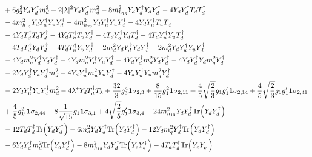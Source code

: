 {\begin{align}
 &+6 g_{2}^{2} {Y_d  Y_{d}^{\dagger}  m_d^2} -2 |\lambda|^2 {Y_d  Y_{d}^{\dagger}  m_d^2} -8 m_{h_{13}}^2 {Y_d  Y_{d}^{\dagger}  Y_d  Y_{d}^{\dagger}} -4 {Y_d  Y_{d}^{\dagger}  T_d  T_{d}^{\dagger}} \nonumber \\ 
 &-4 m_{h_{13}}^2 {Y_d  Y_{u}^{\dagger}  Y_u  Y_{d}^{\dagger}} -4 m_{h_{23}}^2 {Y_d  Y_{u}^{\dagger}  Y_u  Y_{d}^{\dagger}} -4 {Y_d  Y_{u}^{\dagger}  T_u  T_{d}^{\dagger}} \nonumber \\ 
 &-4 {Y_d  T_{d}^{\dagger}  T_d  Y_{d}^{\dagger}} -4 {Y_d  T_{u}^{\dagger}  T_u  Y_{d}^{\dagger}} -4 {T_d  Y_{d}^{\dagger}  Y_d  T_{d}^{\dagger}} -4 {T_d  Y_{u}^{\dagger}  Y_u  T_{d}^{\dagger}} \nonumber \\ 
 &-4 {T_d  T_{d}^{\dagger}  Y_d  Y_{d}^{\dagger}} -4 {T_d  T_{u}^{\dagger}  Y_u  Y_{d}^{\dagger}} -2 {m_d^2  Y_d  Y_{d}^{\dagger}  Y_d  Y_{d}^{\dagger}} -2 {m_d^2  Y_d  Y_{u}^{\dagger}  Y_u  Y_{d}^{\dagger}} \nonumber \\ 
 &-4 {Y_d  m_q^2  Y_{d}^{\dagger}  Y_d  Y_{d}^{\dagger}} -4 {Y_d  m_q^2  Y_{u}^{\dagger}  Y_u  Y_{d}^{\dagger}} -4 {Y_d  Y_{d}^{\dagger}  m_d^2  Y_d  Y_{d}^{\dagger}} -4 {Y_d  Y_{d}^{\dagger}  Y_d  m_q^2  Y_{d}^{\dagger}} \nonumber \\ 
 &-2 {Y_d  Y_{d}^{\dagger}  Y_d  Y_{d}^{\dagger}  m_d^2} -4 {Y_d  Y_{u}^{\dagger}  m_u^2  Y_u  Y_{d}^{\dagger}} -4 {Y_d  Y_{u}^{\dagger}  Y_u  m_q^2  Y_{d}^{\dagger}} \nonumber \\ 
 &-2 {Y_d  Y_{u}^{\dagger}  Y_u  Y_{d}^{\dagger}  m_d^2} -4 \lambda^* {Y_d  T_{d}^{\dagger}} T_{\lambda} +\frac{32}{3} g_{3}^{4} {\bf 1} \sigma_{2,3} +\frac{8}{15} g_{1}^{2} {\bf 1} \sigma_{2,11} +\frac{4}{5} \sqrt{\frac{2}{3}} g_1 g_1' {\bf 1} \sigma_{2,14} +\frac{4}{5} \sqrt{\frac{2}{3}} g_1 g_1' {\bf 1} \sigma_{2,41} \nonumber \\ 
 &+\frac{4}{5} g_{1'}^{2} {\bf 1} \sigma_{2,44} +8 \frac{1}{\sqrt{15}} g_1 {\bf 1} \sigma_{3,1} +4 \sqrt{\frac{2}{5}} g_1' {\bf 1} \sigma_{3,4} -24 m_{h_{13}}^2 {Y_d  Y_{d}^{\dagger}} \mbox{Tr}\Big({Y_d  Y_{d}^{\dagger}}\Big) \nonumber \\ 
 &-12 {T_d  T_{d}^{\dagger}} \mbox{Tr}\Big({Y_d  Y_{d}^{\dagger}}\Big) -6 {m_d^2  Y_d  Y_{d}^{\dagger}} \mbox{Tr}\Big({Y_d  Y_{d}^{\dagger}}\Big) -12 {Y_d  m_q^2  Y_{d}^{\dagger}} \mbox{Tr}\Big({Y_d  Y_{d}^{\dagger}}\Big) \nonumber \\ 
 &-6 {Y_d  Y_{d}^{\dagger}  m_d^2} \mbox{Tr}\Big({Y_d  Y_{d}^{\dagger}}\Big) -8 m_{h_{13}}^2 {Y_d  Y_{d}^{\dagger}} \mbox{Tr}\Big({Y_e  Y_{e}^{\dagger}}\Big) -4 {T_d  T_{d}^{\dagger}} \mbox{Tr}\Big({Y_e  Y_{e}^{\dagger}}\Big) \nonumber \\ 

\end{align}}
